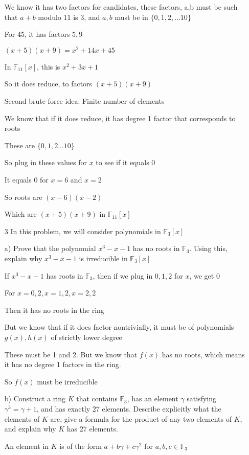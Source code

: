 \documentclass[12pt]{article}
\begin{document}
\begin{itemize}
		We know it has two factors for candidates, these factors, a,b must be such that $a + b$ modulo $11$ is 3, and $a,b$ must be in $\{0,1,2,...10\}$

		For 45, it has factors $5, 9$

		$(x+5)(x+9) = x^2 + 14x + 45$

		In $\mathbb{F}_{11}[x]$, this is $x^2 + 3x + 1$

		So it does reduce, to factors $(x+5)(x+9)$

		Second brute force idea: Finite number of elements

		We know that if it does reduce, it has degree 1 factor that corresponds to roots

		These are $\{0,1,2...10\}$

		So plug in these values for $x$ to see if it equals 0

		It equals 0 for $x = 6$ and $x = 2$

		So roots are $(x-6)(x-2)$

		Which are $(x+5)(x+9)$ in $\mathbb{F}_{11}[x]$

	\item[3] In this problem, we will consider polynomials in $\mathbb{F}_3[x]$

		a) Prove that the polynomial $x^3 - x - 1$ has no roots in $\mathbb{F}_3$. Using this, explain why $x^3 - x - 1$ is irreducible in $\mathbb{F}_3[x]$

		If $x^3 - x - 1$ has roots in $\mathbb{F}_3$, then if we plug in $0, 1, 2$ for $x$, we get 0

		For $x = 0, 2, x = 1, 2, x = 2, 2$

		Then it has no roots in the ring

		But we know that if it does factor nontrivially, it must be of polynomials $g(x),h(x)$ of strictly lower degree

		These must be 1 and 2. But we know that $f(x)$ has no roots, which means it has no degree 1 factors in the ring.

		So $f(x)$ must be irreducible

		b) Construct a ring $K$ that contains $\mathbb{F}_3$, has an element $\gamma$ satisfying $\gamma^3 = \gamma + 1$, and has exactly 27 elements. Describe explicitly what the elements of $K$ are, give a formula for the product of any two elements of $K$, and explain why $K$ has 27 elements.

		An element in $K$ is of the form $a + b\gamma + c\gamma^2$ for $a,b,c \in \mathbb{F}_3$


\end{itemize}
\end{document}
